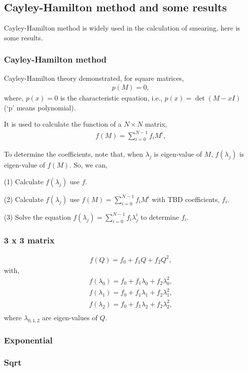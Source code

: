\subsection{\label{CayleyHamilton}Cayley-Hamilton method and some results}

Cayley-Hamilton method is widely used in the calculation of smearing, here is some results.

\subsubsection{\label{CayleyHamiltonMethod}Cayley-Hamilton method}

Cayley-Hamilton theory demonstrated, for square matrices,
\begin{equation}
\begin{split}
&p(M)=0,
\end{split}
\end{equation}
where, $p(x)=0$ is the characteristic equation, i.e., $p(x)=\det(M-x I)$ (`p' means polynomial).

It is used to calculate the function of a $N\times N$ matrix, 
\begin{equation}
\begin{split}
&f(M)=\sum _{i=0}^{N-1} f_i M^i,
\end{split}
\end{equation}

To determine the coefficients, note that, when $\lambda _j$ is eigen-value of $M$, $f(\lambda _j)$ is eigen-value of $f(M)$. So, we can,

(1) Calculate $f(\lambda _j)$ use $f$.

(2) Calculate $f(\lambda _j)$ use $f(M)=\sum _{i=0}^{N-1} f_i M^i$ with TBD coefficients, $f_i$.

(3) Solve the equation $f(\lambda _j)=\sum _{i=0}^{N-1} f_i \lambda _j^i$ to determine $f_i$.


\subsubsection{\label{CayleyHamilton3by3}3 x 3 matrix}

\begin{equation}
\begin{split}
&f(Q)=f_0+f_1Q+f_2Q^2,
\end{split}
\end{equation}
with,
\begin{equation}
\begin{split}
&f(\lambda_0)=f_0+f_1\lambda_0+f_2\lambda_0^2,\\
&f(\lambda_1)=f_0+f_1\lambda_1+f_2\lambda_1^2,\\
&f(\lambda_2)=f_0+f_1\lambda_2+f_2\lambda_2^2,\\
\end{split}
\end{equation}
where $\lambda_{0,1,2}$ are eigen-values of $Q$.


\subsubsection{\label{CayleyHamiltonExponetial}Exponential}


\subsubsection{\label{CayleyHamiltonSqrt}Sqrt}